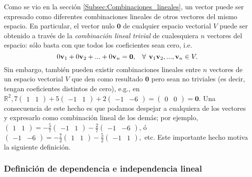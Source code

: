 \documentclass[12pt,dvipsnames]{article}
\begin{document}
Como se vio en la sección \ref{Subsec:Combinaciones_lineales}, un vector puede ser expresado como diferentes combinaciones lineales de otros vectores del mismo espacio. En particular, el vector nulo $\mathbf{0}$ de cualquier espacio vectorial $V$ puede ser obtenido a través de la \emph{combinación lineal trivial} de cualesquiera $n$ vectores del espacio: sólo basta con que todos los coeficientes sean cero, i.e. $$0\mathbf{v}_1+0\mathbf{v}_2+...+0\mathbf{v}_n=\mathbf{0}, \hspace{3mm}\forall\hspace{1.5mm}\mathbf{v}_1 \mathbf{v}_2, ...,\mathbf{v}_n \in V.$$ Sin embargo, también pueden existir combinaciones lineales entre $n$ vectores de un espacio vectorial $V$ que den como resultado $\mathbf{0}$ pero sean no triviales (es decir, tengan coeficientes distintos de cero), e.g., en $\mathbb{R}^2, 7\begin{pmatrix} 1 & 1 \end{pmatrix}+5\begin{pmatrix} -1 & 1 \end{pmatrix}+2\begin{pmatrix} -1 & -6 \end{pmatrix}=\begin{pmatrix} 0 & 0 \end{pmatrix}=\mathbf{0}$. Una consecuencia de este hecho es que podamos despejar a cualquiera de los vectores y expresarlo como combinación lineal de los demás; por ejemplo, $\begin{pmatrix} 1 & 1 \end{pmatrix}=-\frac{5}{7}\begin{pmatrix} -1 & 1 \end{pmatrix}-\frac{2}{7}\begin{pmatrix} -1 & -6 \end{pmatrix}$, ó $\begin{pmatrix} -1 & -6 \end{pmatrix} = -\frac{7}{2}\begin{pmatrix} 1 & 1 \end{pmatrix}-\frac{5}{2}\begin{pmatrix} -1 & 1 \end{pmatrix},$ etc. Este importante hecho motiva la siguiente definición.

\subsubsection{Definición de dependencia e independencia lineal} \label{Def:Dependencia_e_independencia_lineal}
\end{document}
